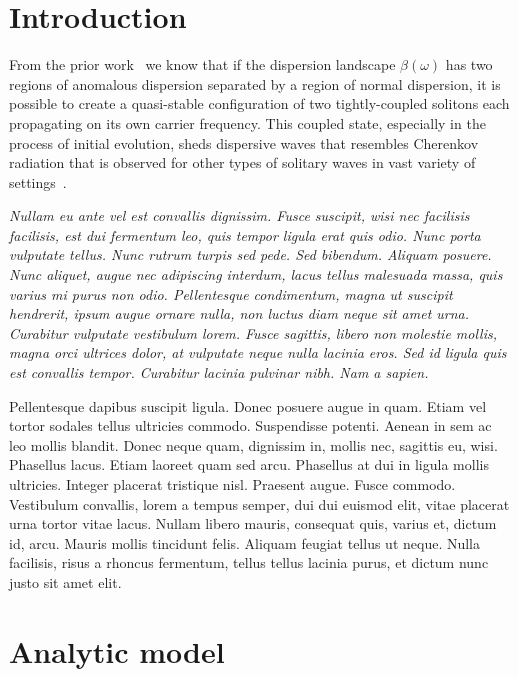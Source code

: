 \documentclass[aps, prl, twocolumn, superscriptaddress, final]{revtex4}
\begin{document}
\section{Introduction}

From the prior work~\cite{melchert2019soliton} we know that if the dispersion landscape $\beta(\omega)$ has two regions of anomalous dispersion separated by a region of normal dispersion, it is possible to create a quasi-stable configuration of two tightly-coupled solitons each propagating on its own carrier frequency. This coupled state, especially in the process of initial evolution, sheds dispersive waves that resembles Cherenkov radiation that is observed for other types of solitary waves in vast variety of settings~\cite{akhmediev1995cherenkov, afanasjev1996effect, driben2015resonant, conforti2015parametric, wright2015ultrabroadband, oreshnikov2017dispersive}.

{
  \it
Nullam eu ante vel est convallis dignissim.  Fusce suscipit, wisi nec facilisis facilisis, est dui fermentum leo, quis tempor ligula erat quis odio.  Nunc porta vulputate tellus.  Nunc rutrum turpis sed pede.  Sed bibendum.  Aliquam posuere.  Nunc aliquet, augue nec adipiscing interdum, lacus tellus malesuada massa, quis varius mi purus non odio.  Pellentesque condimentum, magna ut suscipit hendrerit, ipsum augue ornare nulla, non luctus diam neque sit amet urna.  Curabitur vulputate vestibulum lorem.  Fusce sagittis, libero non molestie mollis, magna orci ultrices dolor, at vulputate neque nulla lacinia eros.  Sed id ligula quis est convallis tempor.  Curabitur lacinia pulvinar nibh.  Nam a sapien.

Pellentesque dapibus suscipit ligula.  Donec posuere augue in quam.  Etiam vel tortor sodales tellus ultricies commodo.  Suspendisse potenti.  Aenean in sem ac leo mollis blandit.  Donec neque quam, dignissim in, mollis nec, sagittis eu, wisi.  Phasellus lacus.  Etiam laoreet quam sed arcu.  Phasellus at dui in ligula mollis ultricies.  Integer placerat tristique nisl.  Praesent augue.  Fusce commodo.  Vestibulum convallis, lorem a tempus semper, dui dui euismod elit, vitae placerat urna tortor vitae lacus.  Nullam libero mauris, consequat quis, varius et, dictum id, arcu.  Mauris mollis tincidunt felis.  Aliquam feugiat tellus ut neque.  Nulla facilisis, risus a rhoncus fermentum, tellus tellus lacinia purus, et dictum nunc justo sit amet elit.
}

\section{Analytic model}%
\label{sec:AnalyticModel}
\end{document}
